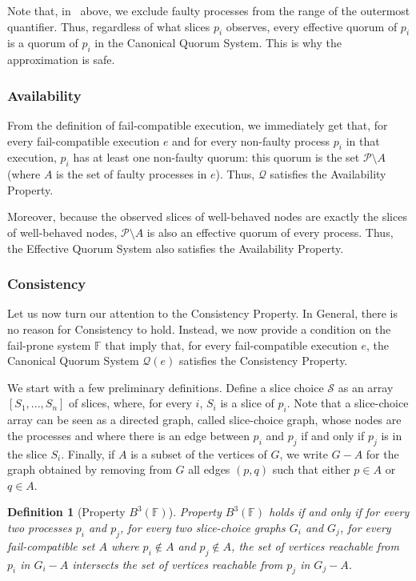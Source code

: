 \documentclass[11pt,letterpaper]{article}
\newtheorem{definition}{Definition}
\begin{document}
Note that, in~ above, we exclude faulty processes from the range of the outermost quantifier.
Thus, regardless of what slices $p_i$ observes, every effective quorum of $p_i$ is a quorum of $p_i$ in the Canonical Quorum System.
This is why the approximation is safe.

\subsubsection{Availability}

From the definition of fail-compatible execution, we immediately get that, for every fail-compatible execution $e$ and for every non-faulty process $p_i$ in that execution, $p_i$ has at least one non-faulty quorum: this quorum is the set $\mathcal{P}\setminus A$ (where $A$ is the set of faulty processes in $e$).
Thus, $\mathcal{Q}$ satisfies the Availability Property.

Moreover, because the observed slices of well-behaved nodes are exactly the slices of well-behaved nodes, $\mathcal{P}\setminus A$ is also an effective quorum of every process.
Thus, the Effective Quorum System also satisfies the Availability Property.

\subsubsection{Consistency}

Let us now turn our attention to the Consistency Property.
In General, there is no reason for Consistency to hold.
Instead, we now provide a condition on the fail-prone system $\mathbb{F}$ that imply that, for every fail-compatible execution $e$, the Canonical Quorum System $\mathcal{Q}(e)$ satisfies the Consistency Property.

We start with a few preliminary definitions.
Define a slice choice $\mathcal{S}$ as an array $\left[S_1,...,S_n\right]$ of slices, where, for every $i$, $S_i$ is a slice of $p_i$.
Note that a slice-choice array can be seen as a directed graph, called slice-choice graph, whose nodes are the processes and where there is an edge between $p_i$ and $p_j$ if and only if $p_j$ is in the slice $S_i$.
Finally, if $A$ is a subset of the vertices of $G$, we write $G-A$ for the graph obtained by removing from $G$ all edges $(p,q)$ such that either $p\in A$ or $q\in A$.

\begin{definition}[Property $B^3(\mathbb{F})$]
  Property $B^3(\mathbb{F})$ holds if and only if for every two processes $p_i$ and $p_j$, for every two slice-choice graphs $G_i$ and $G_j$, for every fail-compatible set $A$ where $p_i\not\in A$ and $p_j\not\in A$, the set of vertices reachable from $p_i$ in $G_i-A$ intersects the set of vertices reachable from $p_j$ in $G_j-A$.
\end{definition}
\end{document}
